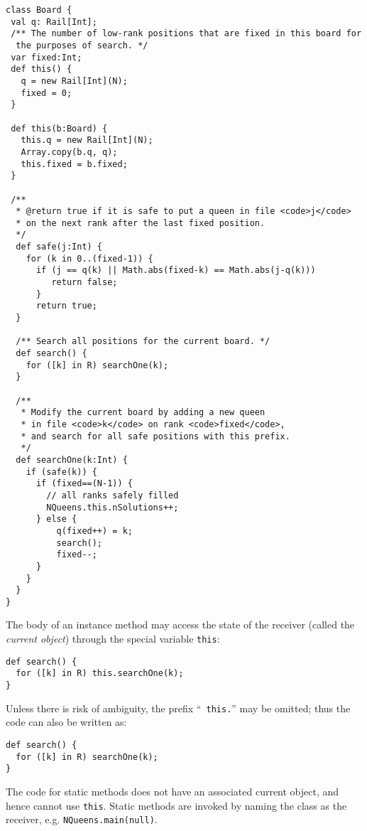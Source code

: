 \begin{table}
{\footnotesize
\begin{verbatim}
class Board {
 val q: Rail[Int];
 /** The number of low-rank positions that are fixed in this board for
  the purposes of search. */ 
 var fixed:Int;
 def this() {
   q = new Rail[Int](N);
   fixed = 0;
 }

 def this(b:Board) {
   this.q = new Rail[Int](N);
   Array.copy(b.q, q);
   this.fixed = b.fixed;
 }

 /** 
  * @return true if it is safe to put a queen in file <code>j</code>
  * on the next rank after the last fixed position.
  */
  def safe(j:Int) {
    for (k in 0..(fixed-1)) {
      if (j == q(k) || Math.abs(fixed-k) == Math.abs(j-q(k)))
         return false;
      }
      return true;
  }

  /** Search all positions for the current board. */
  def search() {
    for ([k] in R) searchOne(k);
  }

  /**
   * Modify the current board by adding a new queen
   * in file <code>k</code> on rank <code>fixed</code>,
   * and search for all safe positions with this prefix.
   */
  def searchOne(k:Int) {
    if (safe(k)) {
      if (fixed==(N-1)) {
        // all ranks safely filled
        NQueens.this.nSolutions++;
      } else {
          q(fixed++) = k;
          search();
          fixed--;
      }
    }
  }
}
\end{verbatim}}
  
\caption{NQueens Board}\label{table:NQueens-Board}
\end{table}

The body of an instance method may access the state of the receiver
(called the {\em current object}) through the special variable {\tt this}:
{\footnotesize
\begin{verbatim}
def search() {
  for ([k] in R) this.searchOne(k);
}
\end{verbatim}}

\noindent Unless there is risk of ambiguity, the prefix ``{\tt
  this.}'' may be omitted; thus the code can also be written as: 
{\footnotesize
\begin{verbatim}
def search() {
  for ([k] in R) searchOne(k);
}
\end{verbatim}}

The code for static methods does not have an associated current
object, and hence cannot use {\tt this}. Static methods are invoked
by naming the class as the receiver, e.g. {\tt NQueens.main(null)}.

